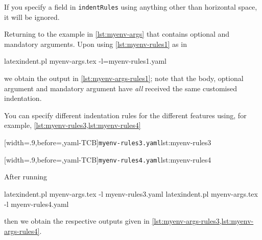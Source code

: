 
If you specify a field in \texttt{indentRules} using anything other than horizontal space, it will be ignored.

Returning to the example in \cref{lst:myenv-args} that contains optional and mandatory arguments. Upon using \cref{lst:myenv-rules1} as in
\begin{commandshell}
latexindent.pl myenv-args.tex -l=myenv-rules1.yaml  
\end{commandshell}
we obtain the output in \cref{lst:myenv-args-rules1}; note that the body, optional argument and mandatory argument have \emph{all} 
received the same customised indentation.

You can specify different indentation rules for the different features using, for example, \cref{lst:myenv-rules3,lst:myenv-rules4}

\begin{minipage}{.49\textwidth}
[width=.9\linewidth,before=\centering,yaml-TCB]{\texttt{myenv-rules3.yaml}}{lst:myenv-rules3}
\end{minipage}
\hfill
\begin{minipage}{.49\textwidth}
[width=.9\linewidth,before=\centering,yaml-TCB]{\texttt{myenv-rules4.yaml}}{lst:myenv-rules4}
\end{minipage}

After running
\begin{commandshell}
latexindent.pl myenv-args.tex -l myenv-rules3.yaml  
latexindent.pl myenv-args.tex -l myenv-rules4.yaml  
\end{commandshell}
then we obtain the respective outputs given in \cref{lst:myenv-args-rules3,lst:myenv-args-rules4}.

\begin{minipage}{.45\textwidth}
\end{minipage}
\hfill
\begin{minipage}{.45\textwidth}
\end{minipage}

